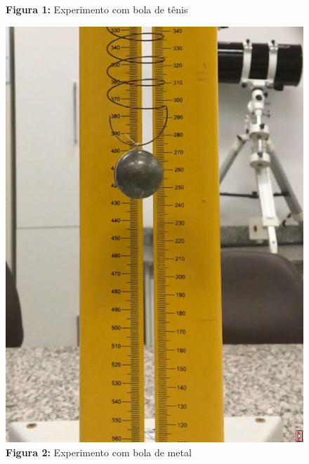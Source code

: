 \documentclass[a4paper, 12pt]{article}
\begin{document}
\begin{multicols}{2}
\begin{enumerate}
\begin{figure}[H]
				\captionsetup{labelformat=empty}
				\caption{\textbf{Figura 1:} Experimento com bola de tênis}
			\end{figure}
			\begin{figure}[H]
				\centering
				\includegraphics[scale=0.3]{./img/1b.png}
				\captionsetup{labelformat=empty}
				\caption{\textbf{Figura 2:} Experimento com bola de metal}
			\end{figure}
			

\end{enumerate}
\end{multicols}
\end{document}
